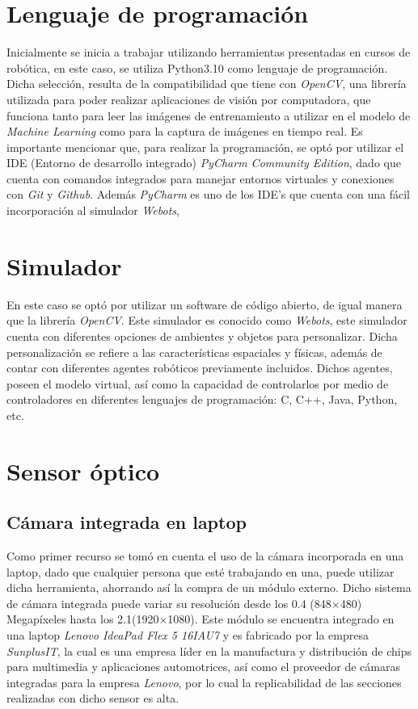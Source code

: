 \section{Lenguaje de programación}
Inicialmente se inicia a trabajar utilizando herramientas presentadas en cursos de robótica, en este caso, se utiliza Python3.10 como lenguaje de programación. Dicha selección, resulta de la compatibilidad que tiene con \textit{OpenCV}, una librería utilizada para poder realizar aplicaciones de visión por computadora, que funciona tanto para leer las imágenes de entrenamiento a utilizar en el modelo de \textit{Machine Learning} como para la captura de imágenes en tiempo real. Es importante mencionar que, para realizar la programación, se optó por utilizar el IDE (Entorno de desarrollo integrado) \textit{PyCharm Community Edition}, dado que cuenta con comandos integrados para manejar entornos virtuales y conexiones con \textit{Git} y \textit{Github}. Además \textit{PyCharm} es uno de los IDE's que cuenta con una fácil incorporación al simulador \textit{Webots}, 

\section{Simulador}
En este caso se optó por utilizar un software de código abierto, de igual manera que la librería \textit{OpenCV}. Este simulador es conocido como \textit{Webots}, este simulador cuenta con diferentes opciones de ambientes y objetos para personalizar. Dicha personalización se refiere a las características espaciales y físicas, además de contar con diferentes agentes robóticos previamente incluidos. Dichos agentes, poseen el modelo virtual, así como la capacidad de controlarlos por medio de controladores en diferentes lenguajes de programación: C, C++, Java, Python, etc. 

\section{Sensor óptico}
\subsection{Cámara integrada en laptop}
Como primer recurso se tomó en cuenta el uso de la cámara incorporada en una laptop, dado que cualquier persona que esté trabajando en una, puede utilizar dicha herramienta, ahorrando así la compra de un módulo externo. Dicho sistema de cámara integrada puede variar su resolución desde los 0.4 (848$\times$480) Megapíxeles hasta los 2.1(1920$\times$1080). Este módulo se encuentra integrado en una laptop \textit{Lenovo IdeaPad Flex 5 16IAU7} y es fabricado por la empresa \textit{SunplusIT}, la cual es una empresa líder en la manufactura y distribución de chips para multimedia y aplicaciones automotrices, así como el proveedor de cámaras integradas para la empresa \textit{Lenovo}, por lo cual la replicabilidad de las secciones realizadas con dicho sensor es alta.

